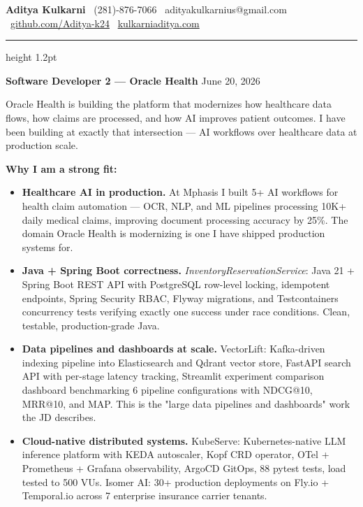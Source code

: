 \documentclass[11pt,letterpaper]{article}
\begin{document}
\thispagestyle{empty}

{\large \textbf{Aditya Kulkarni}} \hfill
{\color{OracleRed} \faPhone\ (281)-876-7066} \quad
{\color{OracleRed} \faEnvelope\ adityakulkarnius@gmail.com} \\
{\color{OracleRed} \faGithub\ \href{https://github.com/Aditya-k24}{github.com/Aditya-k24}} \quad
{\color{OracleRed} \faGlobe\ \href{https://www.kulkarniaditya.com}{kulkarniaditya.com}}

\vspace{6pt}
{\color{OracleRed}\hrule height 1.2pt}
\vspace{12pt}

{\color{OracleRed} \textbf{Software Developer 2 --- Oracle Health}} \hfill June 20, 2026

\vspace{10pt}

Oracle Health is building the platform that modernizes how healthcare data flows, how claims are processed, and how AI improves patient outcomes. I have been building at exactly that intersection --- AI workflows over healthcare data at production scale.

\vspace{6pt}

\textbf{Why I am a strong fit:}

\begin{itemize}
  \item[\faAngleRight] \textbf{Healthcare AI in production.} At Mphasis I built 5+ AI workflows for health claim automation --- OCR, NLP, and ML pipelines processing 10K+ daily medical claims, improving document processing accuracy by 25\%. The domain Oracle Health is modernizing is one I have shipped production systems for.

  \item[\faAngleRight] \textbf{Java + Spring Boot correctness.} \textit{InventoryReservationService}: Java 21 + Spring Boot REST API with PostgreSQL row-level locking, idempotent endpoints, Spring Security RBAC, Flyway migrations, and Testcontainers concurrency tests verifying exactly one success under race conditions. Clean, testable, production-grade Java.

  \item[\faAngleRight] \textbf{Data pipelines and dashboards at scale.} VectorLift: Kafka-driven indexing pipeline into Elasticsearch and Qdrant vector store, FastAPI search API with per-stage latency tracking, Streamlit experiment comparison dashboard benchmarking 6 pipeline configurations with NDCG@10, MRR@10, and MAP. This is the "large data pipelines and dashboards" work the JD describes.

  \item[\faAngleRight] \textbf{Cloud-native distributed systems.} KubeServe: Kubernetes-native LLM inference platform with KEDA autoscaler, Kopf CRD operator, OTel + Prometheus + Grafana observability, ArgoCD GitOps, 88 pytest tests, load tested to 500 VUs. Isomer AI: 30+ production deployments on Fly.io + Temporal.io across 7 enterprise insurance carrier tenants.
\end{itemize}
\end{document}
